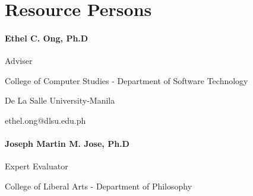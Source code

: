 %
%
%                 

\chapter{Resource Persons}
\label{sec:appendixc}

\subsubsection{Ethel C. Ong, Ph.D}
Adviser

College of Computer Studies - Department of Software Technology

De La Salle University-Manila

ethel.ong@dlsu.edu.ph

\subsubsection{Joseph Martin M. Jose, Ph.D}
Expert Evaluator

College of Liberal Arts - Department of Philosophy

